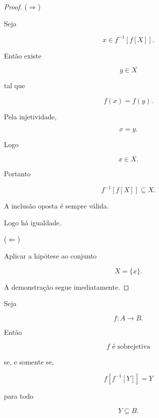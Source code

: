 \documentclass[../../main]{subfiles}
\begin{document}
\begin{proof}

	(\(\Rightarrow\))

	Seja

	\[
		x\in f^{-1}[f[X]].
	\]

	Então existe

	\[
		y\in X
	\]

	tal que

	\[
		f(x)=f(y).
	\]

	Pela injetividade,

	\[
		x=y.
	\]

	Logo

	\[
		x\in X.
	\]

	Portanto

	\[
		f^{-1}[f[X]]
		\subseteq
		X.
	\]

	A inclusão oposta é sempre válida.

	Logo há igualdade.

	(\(\Leftarrow\))

	Aplicar a hipótese ao conjunto

	\[
		X=\{x\}.
	\]

	A demonstração segue imediatamente.

\end{proof}

\begin{prop}
	\label{prop:matematica:funcoes:imagem-direta-e-inversa:caracterizacao-sobrejetividade}

	Seja

	\[
		f:A\to B.
	\]

	Então

	\[
		f
		\text{ é sobrejetiva}
	\]

	se, e somente se,

	\[
		f[f^{-1}[Y]]
		=
		Y
	\]

	para todo

	\[
		Y\subseteq B.
	\]

\end{prop}
\end{document}
